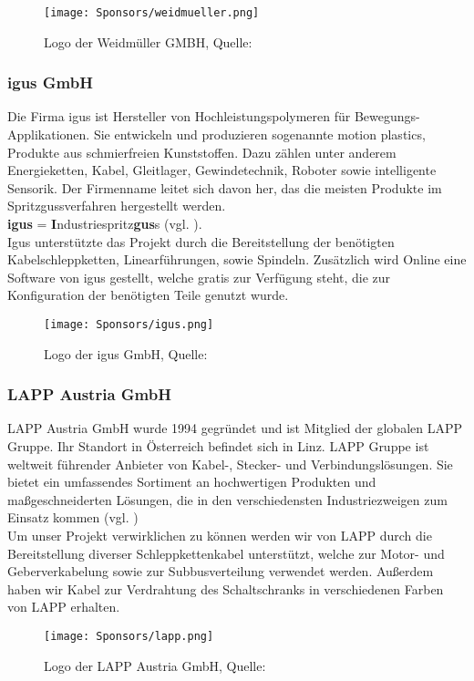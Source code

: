 \begin{figure}[H]
    \centering
    \texttt{[image: Sponsors/weidmueller.png]}
    \caption{Logo der Weidmüller GMBH, Quelle: \cite{weidmueller_logo}}
    \label{fig:weidmueller_logo}
\end{figure}

\subsubsection{igus GmbH}
Die Firma igus ist Hersteller von Hochleistungspolymeren für Bewegungs-Applikationen. Sie entwickeln und produzieren sogenannte motion plastics, Produkte aus schmierfreien Kunststoffen. Dazu zählen unter anderem Energieketten, Kabel, Gleitlager, Gewindetechnik, Roboter sowie intelligente Sensorik. Der Firmenname leitet sich davon her, das die meisten Produkte im Spritzgussverfahren hergestellt werden.\\
\textbf{igus} = \textbf{I}ndustriespritz\textbf{gus}s (vgl. \cite{igus}). \\
Igus unterstützte das Projekt durch die Bereitstellung der benötigten Kabelschleppketten, Linearführungen, sowie Spindeln. Zusätzlich wird Online eine Software von igus gestellt, welche gratis zur Verfügung steht, die zur Konfiguration der benötigten Teile genutzt wurde.

\begin{figure}[H]
    \centering
    \texttt{[image: Sponsors/igus.png]}
    \caption{Logo der igus GmbH,  Quelle: \cite{igus_logo}}
    \label{fig:igus_logo}
\end{figure}

\subsubsection{LAPP Austria GmbH}
LAPP Austria GmbH wurde 1994 gegründet und ist Mitglied der globalen LAPP Gruppe. Ihr Standort in Österreich befindet sich in Linz. LAPP Gruppe ist weltweit führender Anbieter von Kabel-, Stecker- und Verbindungslösungen. Sie bietet ein umfassendes Sortiment an hochwertigen Produkten und maßgeschneiderten Lösungen, die in den verschiedensten Industriezweigen zum Einsatz kommen (vgl. \cite{lapp})\\
Um unser Projekt verwirklichen zu können werden wir von LAPP durch die Bereitstellung diverser Schleppkettenkabel unterstützt, welche zur Motor- und Geberverkabelung sowie zur Subbusverteilung verwendet werden. Außerdem haben wir Kabel zur Verdrahtung des Schaltschranks in verschiedenen Farben von LAPP erhalten.
\begin{figure}[H]
    \centering
    \vspace{5mm}
    \texttt{[image: Sponsors/lapp.png]}
    \caption{Logo der LAPP Austria GmbH, Quelle: \cite{lapp_logo}}
    \label{fig:lapp_logo}
\end{figure}

